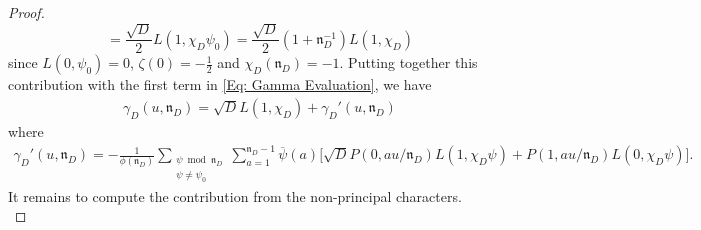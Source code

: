 \documentclass[11pt]{amsart}
\numberwithin{equation}{section}
\newcommand{\mf}{\mathfrak}
\newcommand{\ol}{\overline}
\theoremstyle{remark}
\begin{document}
\begin{proof}
\[ =
 \frac{\sqrt{D}}{2}L(1,\chi_D\psi_0)
 =
\frac{\sqrt{D}}{2}(1+\mf{n}_D^{-1})L(1,\chi_D)   
\] 
since $L(0,\psi_0)=0$, $\zeta(0)=-\frac12$ and $\chi_D(\mf{n}_D)=-1$. Putting together this contribution with the first term in \eqref{Eq: Gamma Evaluation}, we have
\begin{align*}
\gamma_D(u,\mf{n}_D) = \sqrt{D}L(1,\chi_D) 
+ \gamma_D'(u,\mf{n}_D)
\end{align*}
where
\begin{align*}
\gamma_D'(u,\mf{n}_D)=
-\frac{1}{\phi(\mf{n}_D)}\sum_{\substack{\psi \bmod \mf{n}_D \\ \psi \neq \psi_0}} \sum_{a=1}^{\mf{n}_D-1}\ol{\psi}(a)\Big[\sqrt{D}P(0,au/\mf{n}_D)L(1,\chi_D\psi)
+
P(1,au/\mf{n}_D)L(0,\chi_D\psi)\Big].
\end{align*}
It remains to compute the contribution from the non-principal characters. \\


\end{proof}
\end{document}
